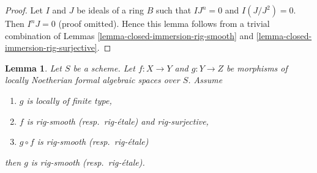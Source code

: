 \documentclass{stacks-project}
\theoremstyle{plain}
\newtheorem{lemma}[subsection]{Lemma}
\theoremstyle{definition}
\theoremstyle{remark}
\numberwithin{equation}{subsection}
\begin{document}
\begin{proof}
Let $I$ and $J$ be ideals of a ring $B$ such that $IJ^n = 0$ and
$I(J/J^2) = 0$. Then $I^nJ = 0$ (proof omitted).
Hence this lemma follows from a trivial combination of
Lemmas \ref{lemma-closed-immersion-rig-smooth} and
\ref{lemma-closed-immersion-rig-surjective}.
\end{proof}

\begin{lemma}
\label{lemma-rig-etale-descent}
Let $S$ be a scheme. Let $f : X \to Y$ and $g : Y \to Z$
be morphisms of locally Noetherian formal algebraic spaces over $S$.
Assume
\begin{enumerate}
\item $g$ is locally of finite type,
\item $f$ is rig-smooth (resp.\ rig-\'etale) and rig-surjective,
\item $g \circ f$ is rig-smooth (resp.\ rig-\'etale)
\end{enumerate}
then $g$ is rig-smooth (resp.\ rig-\'etale).
\end{lemma}
\end{document}
